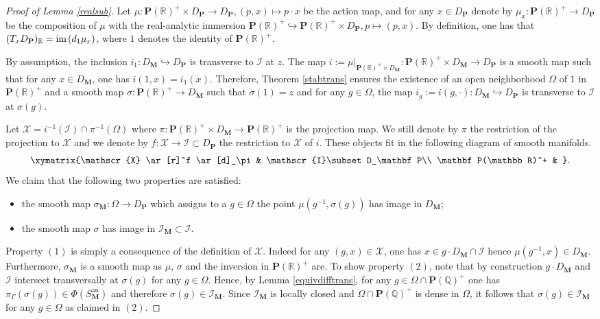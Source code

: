 \documentclass[10pt]{article}
\numberwithin{equation}{subsection}
\theoremstyle{plain}
\theoremstyle{definition}
\theoremstyle{remark}
\newcommand{\I}{\mathscr{I}}
\newcommand{\Q}{\mathbb Q}
\newcommand{\R}{\mathbb R}
\newcommand{\pp}{\mathbf P}
\newcommand{\M}{\mathbf M}
\newcommand{\im}{\mathrm{im} \hspace{0.05cm}}
\newcommand{\an}{\mathrm{an}}
\begin{document}
\begin{proof}[Proof of Lemma \ref{realsub}]
Let $\mu : \pp(\R)^+ \times D_\pp \rightarrow D_\pp, (p,x) \mapsto p \cdot x$ be the action map, and for any $x \in D_\pp$ denote by $\mu_x : \pp(\R)^+ \rightarrow D_\pp$ be the composition of $\mu$ with the real-analytic immersion $\pp(\R)^+ \hookrightarrow \pp(\R)^+ \times D_\pp, p \mapsto (p,x)$. By definition, one has that $(T_x D_\pp)_\R = \im(d_{1}\mu_x)$, where $1$ denotes the identity of $\pp(\R)^+$.

By assumption, the inclusion $i_1 : D_\M \hookrightarrow D_\pp$ is transverse to $\I$ at $z$. The map $i:= \mu\vert_{\pp(\R)^+ \times D_\M}: \pp(\R)^+ \times D_\M \rightarrow D_\pp$ is a smooth map such that for any $x \in D_\M$, one has $i(1,x) = i_1(x)$. Therefore, Theorem \ref{stabtrans} ensures the existence of an open neighborhood $\Omega$ of $1$ in $\pp(\R)^+$ and a smooth map $\sigma : \pp(\R)^+ \rightarrow D_\M$ such that $\sigma(1) = z$ and for any $g \in \Omega$, the map $i_g := i(g, \cdot) : D_\M \hookrightarrow D_\pp$ is transverse to $\I$ at $\sigma(g)$.

Let $\mathscr{X} = i^{-1}(\I) \cap \pi^{-1}(\Omega)$ where $\pi : \pp(\R)^+ \times D_\M \rightarrow \pp(\R)^+$ is the projection map. We still denote by $\pi$ the restriction of the projection to $\mathscr{X}$ and we denote by $f : \mathscr{X} \rightarrow \I \subset D_\pp$ the restriction to $\mathscr{X}$ of $i$. These objects fit in the following diagram of smooth manifolds.
\[
\xymatrix{\mathscr{X} \ar[r]^f \ar[d]_\pi & \I \subset D_\pp \\ \pp(\R)^+ & }.
\]
We claim that the following two properties are satisfied:
\begin{itemize}
\item[$(1)$] the smooth map $\sigma_\M : \Omega \rightarrow D_\pp$ which assigns to a $g \in \Omega$ the point $\mu(g^{-1}, \sigma(g))$ has image in $D_\M$;
\item[$(2)$] the smooth map $\sigma$ has image in $\I_\M \subset \I$.
\end{itemize}
Property $(1)$ is simply a consequence of the definition of $\mathscr{X}$. Indeed for any $(g,x) \in \mathscr{X}$, one has $x \in g \cdot D_\M \cap \I$ hence $\mu(g^{-1},x) \in D_\M$. Furthermore, $\sigma_\M$ is a smooth map as $\mu$, $\sigma$ and the inversion in $\pp(\R)^+$ are. To show property $(2)$, note that by construction $g \cdot D_\M$ and $\I$ intersect transversally at $\sigma(g)$ for any $g \in \Omega$. Hence, by Lemma \ref{equivdifftrans}, for any $g \in \Omega \cap \pp(\Q)^+$ one has $\pi_\Gamma(\sigma(g)) \in \Phi(S_\M^\an)$ and therefore $\sigma(g) \in \I_\M$. Since $\I_\M$ is locally closed and $\Omega \cap \pp(\Q)^+$ is dense in $\Omega$, it follows that $\sigma(g) \in \I_\M$ for any $g \in \Omega$ as claimed in $(2)$.


\end{proof}
\end{document}
